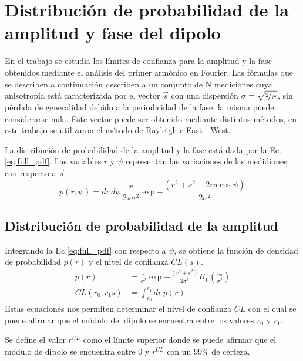 \chapter{Distribución de probabilidad de la amplitud y fase del dipolo}

En el trabajo \cite{linsley1975fluctuation} se estudia los límites de confianza para la amplitud y la fase obtenidos mediante el análisis del primer armónico en Fourier. Las fórmulas que se describen a continuación describen a un conjunto de N mediciones cuya anisotropía está caracterizada por el vector $\vec{s}$ con una dispersión $\sigma = \sqrt{\nicefrac{2}{N}}$, sin pérdida de generalidad debido a la periodicidad de la fase, la misma puede considerarse nula. Este vector puede ser obtenido mediante distintos métodos, en este trabajo se  utilizaron el método de Rayleigh e East - West.

La distribución de probabilidad de la amplitud y la fase está dada por la Ec.\ref{eq:full_pdf}. Las variables $r$ y $\psi$ representan las variaciones de las medidiones con respecto a $\vec{s}$
\begin{equation}
    p(r,\psi) =dr\,d\psi\,\frac{r}{2\pi\sigma^2}\exp{ -\frac{(r^2+s^2 - 2rs\cos\psi)}{2\sigma^2} } \label{eq:full_pdf}
\end{equation}  

\section{Distribución de probabilidad de la amplitud}

Integrando la Ec.\ref{eq:full_pdf} con respecto a $\psi$, se obtiene la función de densidad de probabilidad $p(r)$ y el nivel de confianza $CL(s)$.
\begin{align}
    p(r) &=\frac{r}{\sigma^2}\exp{ -\frac{(r^2+s^2)}{2\sigma^2} }K_0(\frac{rs}{\sigma^2})    \label{ec:pdf}\\
    CL(r_0,r_1s) &= \int_{r_0}^{r_1} dr \, p(r)
    \label{ec:integral}
\end{align}  
Estas ecuaciones nos permiten determinar el nivel de confianza $CL$ con el cual se puede afirmar que el módulo del dipolo se encuentra entre los valores $r_0$ y $r_1$.

Se define el valor $r^{UL}$ como el límite superior donde se  puede afirmar que el módulo de dipolo se encuentra entre 0 y $r^{UL}$ con un $99\%$ de certeza.

